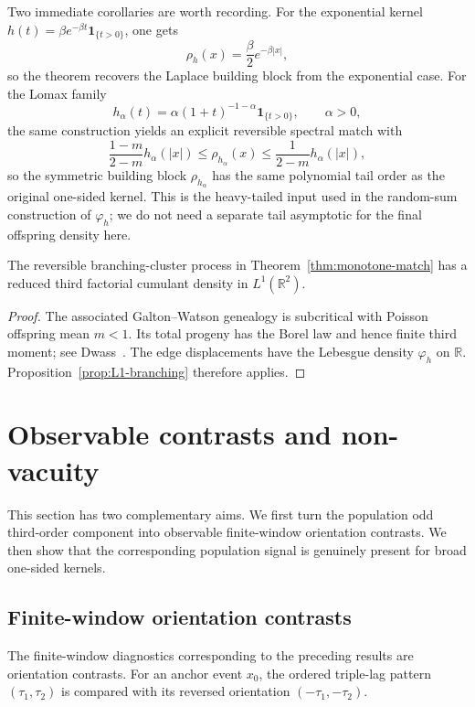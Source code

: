 \documentclass[aap,press]{apt} \volno{00} \partno{00}
\newcommand{\R}{\mathbb{R}}
\newcommand{\1}{\mathbf{1}}
\numberwithin{equation}{section}
\begin{document}
Two immediate corollaries are worth recording. For the exponential kernel $h(t)=\beta e^{-\beta t}\1_{\{t>0\}}$, one gets
\[
\rho_h(x)=\frac{\beta}{2}e^{-\beta|x|},
\]
so the theorem recovers the Laplace building block from the exponential case. For the Lomax family
\[
h_\alpha(t)=\alpha(1+t)^{-1-\alpha}\1_{\{t>0\}},\qquad \alpha>0,
\]
the same construction yields an explicit reversible spectral match with
\[
\frac{1-m}{2-m}h_\alpha(|x|)\le \rho_{h_\alpha}(x)\le \frac{1}{2-m}h_\alpha(|x|),
\]
so the symmetric building block $\rho_{h_\alpha}$ has the same polynomial tail order as the original one-sided kernel. This is the heavy-tailed input used in the random-sum construction of $\varphi_h$; we do not need a separate tail asymptotic for the final offspring density here.

\begin{cor}\label{cor:L1-undirected-match}
The reversible branching-cluster process in Theorem~\ref{thm:monotone-match} has a reduced third factorial cumulant density in $L^1(\R^2)$.
\end{cor}


\begin{proof}
The associated Galton--Watson genealogy is subcritical with Poisson
offspring mean \(m<1\). Its total progeny has the Borel law and hence
finite third moment; see Dwass~\cite{dwass1969total}. The edge
displacements have the Lebesgue density \(\varphi_h\) on \(\R\).
Proposition~\ref{prop:L1-branching} therefore applies.
\end{proof}

\section{Observable contrasts and non-vacuity}

This section has two complementary aims. We first turn the population odd third-order component into observable finite-window orientation contrasts. We then show that the corresponding population signal is genuinely present for broad one-sided kernels.

\subsection{Finite-window orientation contrasts}

The finite-window diagnostics corresponding to the preceding results are orientation contrasts. For an anchor event $x_0$, the ordered triple-lag pattern $(\tau_1,\tau_2)$ is compared with its reversed orientation $(-\tau_1,-\tau_2)$.
\end{document}
